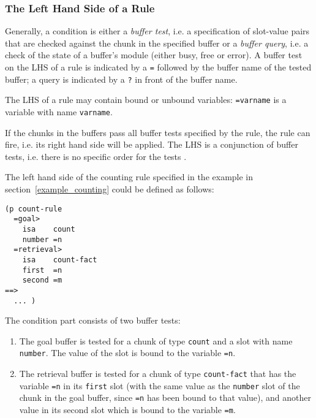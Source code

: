 \subsubsection{The Left Hand Side of a Rule}

Generally, a condition is either a \emph{buffer test}, i.e. a specification of slot-value pairs that are checked against the chunk in the specified buffer or a \emph{buffer query}, i.e. a check of the state of a buffer's module (either busy, free or error). A buffer test on the LHS of a rule is indicated by a \lstinline|=| followed by the buffer name of the tested buffer; a query is indicated by a \lstinline|?| in front of the buffer name.

The LHS of a rule may contain bound or unbound variables: \lstinline|=varname| is a variable with name \lstinline|varname|.

If the chunks in the buffers pass all buffer tests specified by the rule, the rule can fire, i.e. its right hand side will be applied. The LHS is a conjunction of buffer tests, i.e. there is no specific order for the tests \cite[p. 165]{actr_reference}.

\begin{example}
The left hand side of the counting rule specified in the example in section~\ref{example_counting} could be defined as follows:

\begin{lstlisting}
(p count-rule
  =goal> 
    isa    count
    number =n
  =retrieval>
    isa    count-fact
    first  =n
    second =m
==>
  ... )
\end{lstlisting}

The condition part consists of two buffer tests:

\begin{enumerate}
 \item The goal buffer is tested for a chunk of type \lstinline|count| and a slot with name \lstinline|number|. The value of the slot is bound to the variable \lstinline|=n|.
 \item The retrieval buffer is tested for a chunk of type \lstinline|count-fact| that has the variable \lstinline|=n| in its \lstinline|first| slot (with the same value as the \lstinline|number| slot of the chunk in the goal buffer, since \lstinline|=n| has been bound to that value), and another value in its second slot which is bound to the variable \lstinline|=m|.
\end{enumerate}

\end{example}

